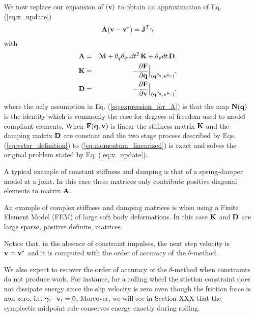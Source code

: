 We now replace our expansion of ${\mathbf{(}}{\mathbf{v}})$ to 
obtain an approximation of Eq. (\ref{eq:v_update})
\begin{eqnarray}
	\mf{A}(\mf{v}-\mf{v}^*)= \mf{J}^T\mf{\gamma}
	\label{eq:momentum_linearized}
\end{eqnarray}
with
\begin{eqnarray}
	\mf{A}&=&\mf{M}+\theta_q\theta_{qv} dt^2\,\mf{K}+\theta_v dt\,\mf{D},
	\label{eq:expression_for_A}\\
	\mf{K}&=&-\frac{\partial \mf{F}}{\partial \mf{q}}\Bigr|_{(\mf{q}^{\theta_q}, \mf{v}^{\theta_v})},\\
	\mf{D}&=&-\frac{\partial \mf{F}}{\partial \mf{v}}\Bigr|_{(\mf{q}^{\theta_q},
	\mf{v}^{\theta_v})}.
	\label{eq:dissipation_matrix}
\end{eqnarray}
where the only assumption in Eq. (\ref{eq:expression_for_A}) is that the map
${\mathbf{N}}({\mathbf{q}})$ is the identity  which is commonly the case for degrees of freedom
used to model compliant elements. When ${\mathbf{F}}({\mathbf{q}}, {\mathbf{v}})$ is linear the
stiffness matrix ${\mathbf{K}}$ and the damping matrix ${\mathbf{D}}$ are constant and the
two stage process described by Eqs. (\ref{eq:vstar_definition}) to
(\ref{eq:momentum_linearized}) is exact and solves the original problem stated
by Eq. (\ref{eq:v_update}).




A typical example of constant stiffness and damping is that of a spring-damper
model at a joint. In this case these matrices only contribute positive diagonal
elements to matrix ${\mathbf{A}}$.

An example of complex stiffness and damping matrices is when using a Finite
Element Model (FEM) of large soft body deformations. In this case ${\mathbf{K}}$ and
${\mathbf{D}}$ are large sparse, positive definite, matrices.



Notice that, in the
absence of constraint impulses, the next step velocity is ${\mathbf{v}}={\mathbf{v}}^*$ and
it is computed with the order of accuracy of the $\theta\text{-method}$. 



We also
expect to recover the order of accuracy of the $\theta\text{-method}$ when
constraints do not produce work. For instance, for a rolling wheel the stiction
constraint does not dissipate energy since the slip velocity is zero even though
the friction force is non-zero, i.e. ${\bm\gamma}_t\cdot{\mathbf{v}}_t = 0$. Moreover, we
will see in Section XXX that the symplectic midpoint rule conserves energy
exactly during rolling.

